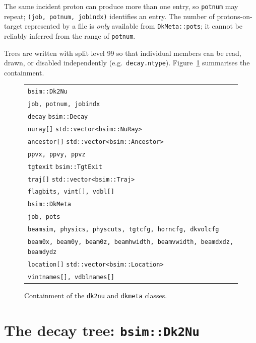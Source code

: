 \documentclass[11pt]{article}
\newcommand{\code}[1]{\texttt{#1}}
\newcommand{\fig}[1]{Figure~\ref{fig:#1}}
\newcommand{\dktwonu}{\texttt{dk2nu}\xspace}
\begin{document}
The same incident proton can produce more than one entry, so
\code{potnum} may repeat; \code{(job, potnum, jobindx)} identifies an entry.
The number of protons-on-target represented by a file is \emph{only}
available from \code{DkMeta::pots}; it cannot be reliably inferred from the
range of \code{potnum}.

Trees are written with split level 99 so that individual members can be
read, drawn, or disabled independently (e.g.\ \code{decay.ntype}).
\fig{classes} summarises the containment.

\begin{figure}[htb]
\centering\small
\begin{tabular}{l}
\code{bsim::Dk2Nu} \\
\quad\code{job, potnum, jobindx} \\
\quad\code{decay} \hfill \code{bsim::Decay} \\
\quad\code{nuray[]} \hfill \code{std::vector<bsim::NuRay>} \\
\quad\code{ancestor[]} \hfill \code{std::vector<bsim::Ancestor>} \\
\quad\code{ppvx, ppvy, ppvz} \\
\quad\code{tgtexit} \hfill \code{bsim::TgtExit} \\
\quad\code{traj[]} \hfill \code{std::vector<bsim::Traj>} \\
\quad\code{flagbits, vint[], vdbl[]} \\[1ex]
\code{bsim::DkMeta} \\
\quad\code{job, pots} \\
\quad\code{beamsim, physics, physcuts, tgtcfg, horncfg, dkvolcfg} \\
\quad\code{beam0x, beam0y, beam0z, beamhwidth, beamvwidth, beamdxdz, beamdydz} \\
\quad\code{location[]} \hfill \code{std::vector<bsim::Location>} \\
\quad\code{vintnames[], vdblnames[]} \\
\end{tabular}
\caption{Containment of the \dktwonu and \code{dkmeta} classes.}
\label{fig:classes}
\end{figure}

\section{The decay tree: \code{bsim::Dk2Nu}}\label{sec:dk2nu}
\end{document}

